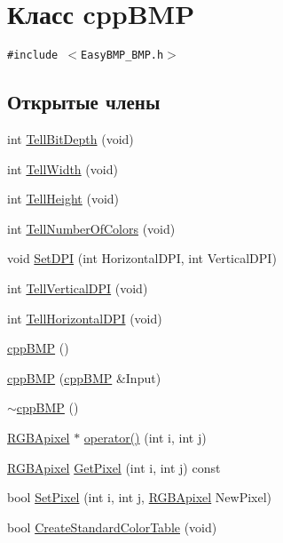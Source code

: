 \hypertarget{classcpp_b_m_p}{
\section{Класс cppBMP}
\label{classcpp_b_m_p}
}
{\tt \#include $<$EasyBMP\_\-BMP.h$>$}

\subsection*{Открытые члены}
\begin{CompactItemize}
\item 
int \hyperlink{classcpp_b_m_p_95cf17f997cf74cbfaf889572bf7d751}{TellBitDepth} (void)
\item 
int \hyperlink{classcpp_b_m_p_539ec9582a0ebd2853d168eae6bfc68f}{TellWidth} (void)
\item 
int \hyperlink{classcpp_b_m_p_8dd563361efe9adc4bbe8ac88681811b}{TellHeight} (void)
\item 
int \hyperlink{classcpp_b_m_p_aef114087d702d456ef994bb64535e6e}{TellNumberOfColors} (void)
\item 
void \hyperlink{classcpp_b_m_p_96505f0e4666bd19d0c60e8eed948158}{SetDPI} (int HorizontalDPI, int VerticalDPI)
\item 
int \hyperlink{classcpp_b_m_p_809856c4aae1027fa37a7c3dd94d06c9}{TellVerticalDPI} (void)
\item 
int \hyperlink{classcpp_b_m_p_b0d8279d21b6890e9f7664bc46d4ff64}{TellHorizontalDPI} (void)
\item 
\hyperlink{classcpp_b_m_p_dd999f78c5b629a718c9ff82dca1b64a}{cppBMP} ()
\item 
\hyperlink{classcpp_b_m_p_97909a5d65342669eb673dc264600058}{cppBMP} (\hyperlink{classcpp_b_m_p}{cppBMP} \&Input)
\item 
\hyperlink{classcpp_b_m_p_ea62579b6a8a25449e108121de524019}{$\sim$cppBMP} ()
\item 
\hyperlink{struct_r_g_b_apixel}{RGBApixel} $\ast$ \hyperlink{classcpp_b_m_p_ffad438a22f268b9cf73d8dcbbcbb13f}{operator()} (int i, int j)
\item 
\hyperlink{struct_r_g_b_apixel}{RGBApixel} \hyperlink{classcpp_b_m_p_230d6694feababb803a9b4cdd4885d4d}{GetPixel} (int i, int j) const 
\item 
bool \hyperlink{classcpp_b_m_p_3d02d63c0abf0c87bb3698b26ac78dae}{SetPixel} (int i, int j, \hyperlink{struct_r_g_b_apixel}{RGBApixel} NewPixel)
\item 
bool \hyperlink{classcpp_b_m_p_2784c5b22510793c4f33bb9f566de4a7}{CreateStandardColorTable} (void)

\end{CompactItemize}
